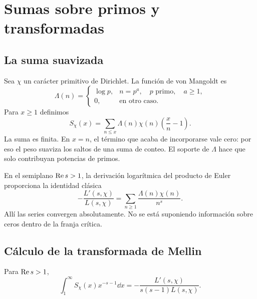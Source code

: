 \section{Sumas sobre primos y transformadas}
\label{sec:sumas}


\subsection{La suma suavizada}

Sea $\chi$ un carácter primitivo de Dirichlet. La función de von Mangoldt es
\[
\Lambda(n)=
\begin{cases}
\log p,& n=p^a,\quad p\text{ primo},\quad a\ge1,\\
0,&\text{en otro caso}.
\end{cases}
\]
Para $x\ge1$ definimos
\begin{equation}
  S_\chi(x)=\sum_{n\le x}\Lambda(n)\chi(n)\left(\frac{x}{n}-1\right).
  \label{eq:suma-suave}
\end{equation}
La suma es finita. En $x=n$, el término que acaba de incorporarse vale cero:
por eso el peso suaviza los saltos de una suma de conteo. El soporte de
$\Lambda$ hace que solo contribuyan potencias de primos.

En el semiplano $\operatorname{Re} s>1$, la derivación logarítmica del producto de Euler
proporciona la identidad clásica
\begin{equation}
  -\frac{L'(s,\chi)}{L(s,\chi)}
   =\sum_{n\ge1}\frac{\Lambda(n)\chi(n)}{n^s}.
  \label{eq:derivada-log}
\end{equation}
Allí las series convergen absolutamente. No se está suponiendo información
sobre ceros dentro de la franja crítica.

\subsection{Cálculo de la transformada de Mellin}

\begin{proposicion}
Para $\operatorname{Re} s>1$,
\begin{equation}
  \int_1^\infty S_\chi(x)x^{-s-1}\dd x
   =-\frac{L'(s,\chi)}{s(s-1)L(s,\chi)}.
  \label{eq:mellin-s}
\end{equation}
\end{proposicion}

